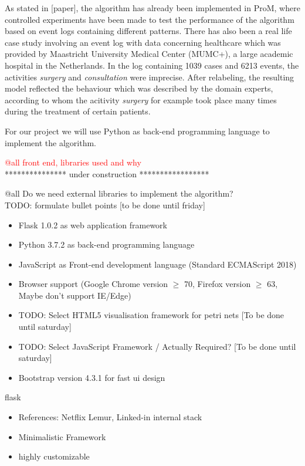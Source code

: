 \documentclass[notitlepage]{article}
\begin{document}
\begin{flushleft}
As stated in [paper], the algorithm has already been implemented in ProM, where controlled experiments have been made to test the performance of the algorithm based on event logs containing different patterns.
There has also been a real life case study involving an event log with data concerning healthcare which was provided by Maastricht University Medical Center (MUMC+), a large academic hospital in the Netherlands.
In the log containing 1039 cases and 6213 events, the activities \textit{surgery} and \textit{consultation} were imprecise.
After relabeling, the resulting model reflected the behaviour which was described by the domain experts, according to whom the acitivity \textit{surgery} for example took place many times during the treatment of certain patients.

For our project we will use Python as back-end programming language to implement the algorithm. 

\textcolor{red}{@all front end, libraries used and why}\\

{\color{gray} *************** under construction *****************}

{\color{red} @all Do we need external libraries to implement the algorithm?}\\
{\color{red} TODO: formulate bullet points [to be done until friday]}

\begin{itemize}
	\item Flask 1.0.2 as web application framework
	\item Python 3.7.2 as back-end programming language
	\item JavaScript as Front-end development language (Standard ECMAScript 2018)
	\item Browser support (Google Chrome version $\geq$ 70, Firefox version $\geq$ 63, Maybe don't support IE/Edge)
	\item {\color{red} TODO: Select HTML5 visualisation framework for petri nets [To be done until saturday]}
	\item {\color{red} TODO: Select JavaScript Framework / Actually Required? [To be done until saturday]}
	\item Bootstrap version 4.3.1 for fast ui design
\end{itemize}

\large{flask}
\begin{itemize}
	\item References: Netflix Lemur, Linked-in internal stack
	\item Minimalistic Framework
	\item highly customizable
\end{itemize}


\end{flushleft}
\end{document}
